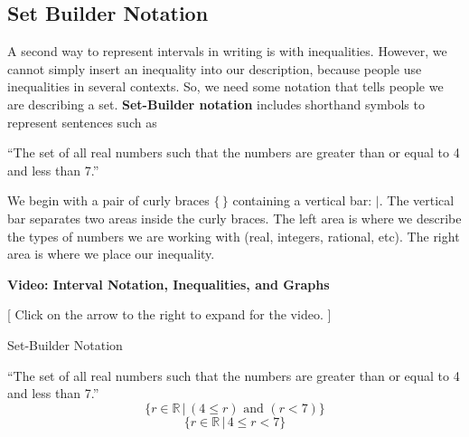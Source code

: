 \documentclass{ximera}
\begin{document}
\subsection*{Set Builder Notation}

A second way to represent intervals in writing is with inequalities. However, we cannot simply insert an inequality into our description, because people use inequalities in several contexts.  So, we need some notation that tells people we are describing a set. \textbf{Set-Builder notation} includes shorthand symbols to represent sentences such as 

\begin{center}
``The set of all real numbers such that the numbers are greater than or equal to 4 and less than 7.''
\end{center}

We begin with a pair of curly braces $\{  \, \}$ containing a vertical bar:  ${|}$.  The vertical bar separates two areas inside the curly braces. The left area is where we describe the types of numbers we are working with (real, integers, rational, etc).  The right area is where we place our inequality.








\begin{onlineOnly}
\begin{explanation} \textbf{\textcolor{red!75!green}{Video: Interval Notation, Inequalities, and Graphs}} 

[ Click on the arrow to the right to expand for the video. ]
\begin{expandable} 

\begin{center}
\end{center}

\end{expandable}

\end{explanation}
\end{onlineOnly}





\begin{example} Set-Builder Notation

``The set of all real numbers such that the numbers are greater than or equal to 4 and less than 7.''
\[ \{ r \in \mathbb {R} \, | \, (4 \leq r)  \text{ and } (r < 7) \} \]
\[ \{ r \in \mathbb {R} \, | \, 4 \leq r < 7 \} \]


\end{example}
\end{document}

